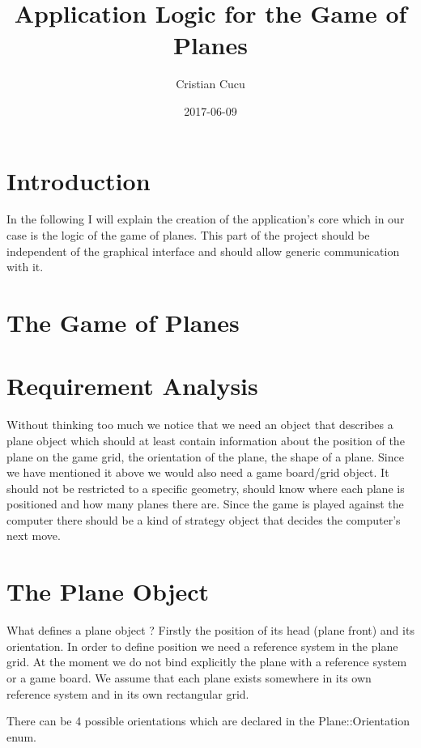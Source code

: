 \documentclass{article}
\title{Application Logic for the Game of Planes}
\date{2017-06-09}
\author{Cristian Cucu}
\begin{document}
\maketitle
\newpage
\section{Introduction}
In the following I will explain the creation of the application's core which in our case is the logic of the game of planes. This part of the project should be independent of the graphical interface and should allow generic communication with it.
\section{The Game of Planes}
\section{Requirement Analysis}
Without thinking too much we notice that we need an object that describes a plane object which should at least contain information about the position of the plane on the game grid, the orientation of the plane, the shape of a plane. Since we have mentioned it above we would also need a game board/grid object. It should not be restricted to a specific geometry, should know where each plane is positioned and how many planes there are. Since the game is played against the computer there should be a kind of strategy object that decides the computer's next move.
\section{The Plane Object}
What defines a plane object ? Firstly the position of its head  (plane front) and its orientation. In order to define position we need a reference system in the plane grid. At the moment we do not bind explicitly the plane with a reference system or a game board. We assume that each plane exists somewhere in its own reference system and in its own rectangular grid. 

There can be 4 possible orientations which are declared in the Plane::Orientation enum.  

\end{document}
